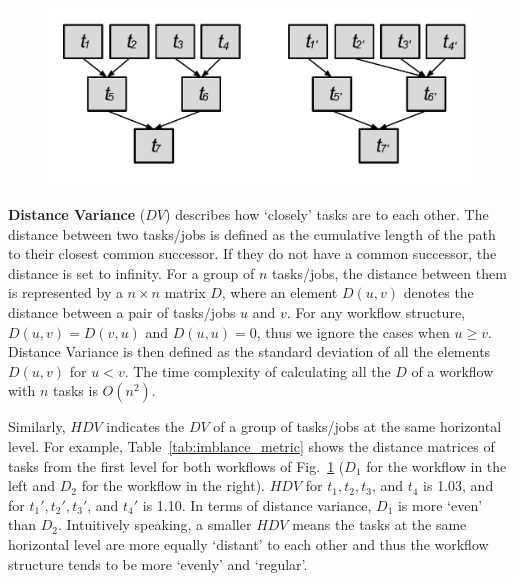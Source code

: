 \begin{figure}[htb]
	\centering
	\includegraphics[width=0.85\linewidth]{figures/imbalance/hifv.pdf}
	\label{fig:imbalance_hifv}
\end{figure}

\textbf{Distance Variance} ($DV$) describes how `closely' tasks are to each other. The distance between two tasks/jobs is defined as the cumulative length of the path to their closest common successor. If they do not have a common successor, the distance is set to infinity. For a group of $n$ tasks/jobs, the distance between them is represented by a $n \times n$ matrix $D$, where an element $D(u,v)$ denotes the distance between a pair of tasks/jobs $u$ and $v$. For any workflow structure, $D(u,v)=D(v,u)$ and $D(u,u)=0$, thus we ignore the cases when $u \geq v$. Distance Variance is then defined as the standard deviation of all the elements $D(u,v)$ for $u<v$. The time complexity of calculating all the $D$ of a workflow with $n$ tasks is $O(n^2)$. 

Similarly, $HDV$ indicates the $DV$ of a group of tasks/jobs at the same horizontal level. For example, Table~\ref{tab:imblance_metric} shows the distance matrices of tasks from the first level for both workflows of Fig.~\ref{fig:imbalance_hifv} ($D_1$ for the workflow in the left and $D_2$ for the workflow in the right). $HDV$ for $t_1, t_2, t_3$, and $t_4$ is 1.03, and for $t_1', t_2', t_3'$, and $t_4'$ is 1.10. In terms of distance variance, $D_1$ is more `even' than $D_2$. Intuitively speaking, a smaller $HDV$ means the tasks at the same horizontal level are more equally `distant' to each other and thus the workflow structure tends to be more `evenly' and `regular'. 

